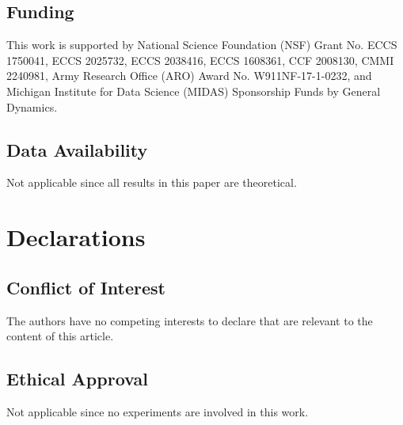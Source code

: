 \documentclass[pdflatex,sn-basic]{sn-jnl}
\theoremstyle{thmstyleone}%
\theoremstyle{thmstyletwo}%
\theoremstyle{thmstylethree}%
\begin{document}
\subsection*{Funding}
This work is supported by National Science Foundation (NSF) Grant No. ECCS 1750041, ECCS 2025732, ECCS 2038416, ECCS 1608361, CCF 2008130, CMMI 2240981, Army Research Office (ARO) Award No. W911NF-17-1-0232, and Michigan Institute for Data Science (MIDAS) Sponsorship Funds by General Dynamics.

\subsection*{Data Availability}
Not applicable since all results in this paper are theoretical.

\section*{Declarations}

\subsection*{Conflict of Interest}
The authors have no competing interests to declare that are relevant to the content of this article.

\subsection*{Ethical Approval}
Not applicable since no experiments are involved in this work.

\end{document}
